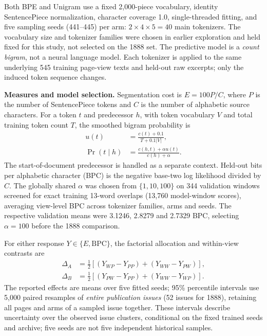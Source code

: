 Both BPE and Unigram use a fixed 2,000-piece vocabulary, identity
SentencePiece normalization, character coverage 1.0, single-threaded
fitting, and five sampling seeds (441--445) per arm:
$2\times4\times5=40$ main tokenizers.
The vocabulary size and tokenizer families were chosen in earlier
exploration and held fixed for this study, not selected on the 1888 set. The predictive model is a
\emph{count bigram}, not a neural language model. Each tokenizer is
applied to the same underlying 545 training page-view texts and held-out
raw excerpts; only the induced token sequence changes.

\noindent\textbf{Measures and model selection.}
Segmentation cost is $E=100P/C$, where $P$ is the number of SentencePiece
tokens and $C$ is the number of alphabetic source characters. For a token
$t$ and predecessor $h$, with token vocabulary $V$ and total training
token count $T$, the smoothed bigram probability is
\begin{equation}
\begin{aligned}
u(t)&=\frac{c(t)+0.1}{T+0.1|V|},\\
\Pr(t\mid h)&=\frac{c(h,t)+\alpha u(t)}{c(h)+\alpha}.
\end{aligned}
\end{equation}
The start-of-document predecessor is handled as a separate context.
Held-out bits per alphabetic character (BPC) is the negative base-two
log likelihood divided by $C$. The globally shared $\alpha$ was
chosen from $\{1,10,100\}$ on 344 validation windows screened for
exact training 13-word overlaps (13,760 model-window scores), averaging
view-level BPC across tokenizer families, arms and seeds. The respective validation
means were 3.1246, 2.8279 and 2.7329 BPC, selecting $\alpha=100$ before
the 1888 comparison.

For either response $Y\in\{E,\mathrm{BPC}\}$, the factorial
allocation and within-view contrasts are
\begin{equation}
\begin{aligned}
\Delta_A&=\tfrac12[(Y_{WP}-Y_{PP})+(Y_{WW}-Y_{PW})],\\
\Delta_B&=\tfrac12[(Y_{PW}-Y_{PP})+(Y_{WW}-Y_{WP})].
\end{aligned}
\end{equation}
The reported effects are means over five fitted seeds; 95\% percentile
intervals use 5,000 paired resamples of \emph{entire publication issues}
(52 issues for 1888), retaining all pages and arms of a sampled issue
together. These intervals describe uncertainty over the observed issue clusters,
conditional on the fixed trained seeds and archive; five seeds are not
five independent historical samples.

